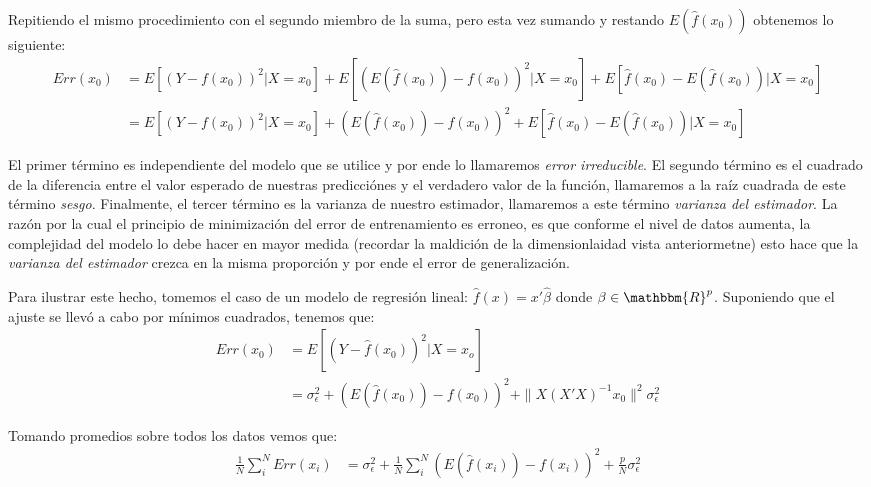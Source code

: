 \documentclass{book}
\theoremstyle{plain}
\theoremstyle{definition}
\theoremstyle{remark}
\begin{document}
Repitiendo el mismo procedimiento con el segundo miembro de la suma, pero esta vez sumando y restando $E(\hat{f}(x_0))$ obtenemos lo siguiente:
\begin{equation*}
\begin{split}
Err(x_0) & =  E[(Y-f(x_0))^2|X = x_0] +  E[(E(\hat{f}(x_0))-f(x_0))^2|X = x_0] + E[\hat{f}(x_0)-E(\hat{f}(x_0))| X = x_0]\\
         & =  E[(Y-f(x_0))^2|X = x_0] +  (E(\hat{f}(x_0))-f(x_0))^2 + E[\hat{f}(x_0)-E(\hat{f}(x_0))| X = x_0]
\end{split}
\end{equation*}

El primer término es independiente del modelo que se utilice y por ende lo llamaremos \emph{error irreducible}. El segundo término es el cuadrado de la diferencia entre el valor esperado de nuestras predicciónes y el verdadero valor de la función, llamaremos a la raíz cuadrada de  este término \emph{sesgo}. Finalmente, el tercer término es la varianza de nuestro estimador, llamaremos a este término \emph{varianza del estimador}. La razón por la cual el principio de minimización del error de entrenamiento es erroneo, es que conforme el nivel de datos aumenta, la complejidad del modelo lo debe hacer en mayor medida (recordar la maldición de la dimensionlaidad vista anteriormetne) esto hace que la \emph{varianza del estimador} crezca en la misma proporción y por ende el error de generalización.

Para ilustrar este hecho, tomemos el caso de un modelo de regresión lineal: $\hat{f}(x)=x'\hat{\beta}$ donde $\beta\in\mathbbm{R}^p$. Suponiendo que el ajuste se llevó a cabo por mínimos cuadrados, tenemos que: 
\begin{equation*}
\begin{split}
Err(x_0) & =  E[(Y-\hat{f}(x_0))^2| X = x_o]\\
         & = \sigma_\epsilon^2 + (E(\hat{f}(x_0))-f(x_0))^2 + \|X(X'X)^{-1}x_0\|^2\sigma_\epsilon^2
\end{split}
\end{equation*}

Tomando promedios sobre todos los datos vemos que:
\begin{equation*}
\begin{split}
\frac{1}{N}\displaystyle\sum_i^NErr(x_i) & =  \sigma_\epsilon^2 +  \frac{1}{N}\displaystyle\sum_i^N (E(\hat{f}(x_i))-f(x_i))^2 + \frac{p}{N}\sigma_\epsilon^2
\end{split}
\end{equation*}
\end{document}
